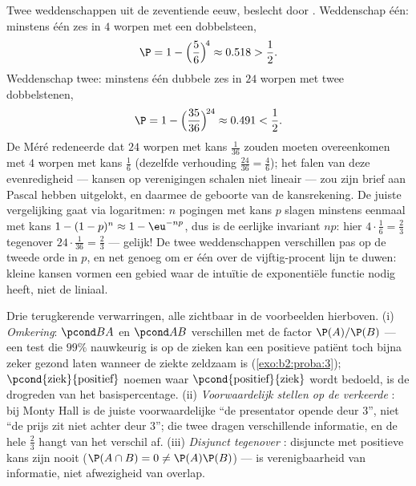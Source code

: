 \begin{example}\label{ex:b2:proba:demere}
Twee weddenschappen uit de zeventiende eeuw, beslecht door
. Weddenschap één: minstens één zes in $4$ worpen
met een dobbelsteen,
\[
\P = 1 - \Bigl(\frac56\Bigr)^{\!4} \approx 0.518 > \frac12 .
\]
Weddenschap twee: minstens één dubbele zes in $24$ worpen met twee
dobbelstenen,
\[
\P = 1 - \Bigl(\frac{35}{36}\Bigr)^{\!24} \approx 0.491 <
\frac12 .
\]
De Méré redeneerde dat $24$ worpen met kans $\frac1{36}$ zouden
moeten overeenkomen met $4$ worpen met kans $\frac16$ (dezelfde
verhouding $\frac{24}{36} = \frac46$); het falen van deze
evenredigheid --- kansen op verenigingen schalen niet lineair ---
zou zijn brief aan Pascal hebben uitgelokt, en daarmee de geboorte
van de kansrekening. De juiste vergelijking gaat via logaritmen:
$n$ pogingen met kans $p$ slagen minstens eenmaal met kans $1 -
(1-p)^n \approx 1 - \eu^{-np}$, dus is de eerlijke invariant $np$:
hier $4\cdot\frac16 = \frac23$ tegenover $24\cdot\frac1{36} =
\frac23$ --- gelijk! De twee weddenschappen verschillen pas op de
tweede orde in $p$, en net genoeg om er één over de vijftig-procent
lijn te duwen: kleine kansen vormen een gebied waar de intuïtie de
exponentiële functie nodig heeft, niet de liniaal.
\end{example}

\begin{remark}
Drie terugkerende verwarringen, alle zichtbaar in de voorbeelden
hierboven. (i) \emph{Omkering}: $\pcond BA$ en $\pcond AB$
verschillen met de factor $\P(A)/\P(B)$ --- een test die $99\%$
nauwkeurig is op de zieken kan een positieve patiënt toch bijna
zeker gezond laten wanneer de ziekte zeldzaam is
(\cref{exo:b2:proba:3}); $\pcond{\text{ziek}}{ \text{positief}}$
noemen waar $\pcond{\text{positief}}{ \text{ziek}}$ wordt bedoeld,
is de drogreden van het basispercentage. (ii) \emph{Voorwaardelijk
stellen op de verkeerde }: bij Monty Hall is de juiste
voorwaardelijke  ``de presentator opende deur $3$'',
niet ``de prijs zit niet achter deur $3$''; die twee dragen
verschillende informatie, en de hele $\frac23$ hangt van het
verschil af. (iii) \emph{Disjunct tegenover }:
disjuncte  met positieve kans zijn nooit
 ($\P(A\cap B) = 0 \neq \P(A)\P(B)$) ---
 is verenigbaarheid van informatie, niet
afwezigheid van overlap.
\end{remark}

